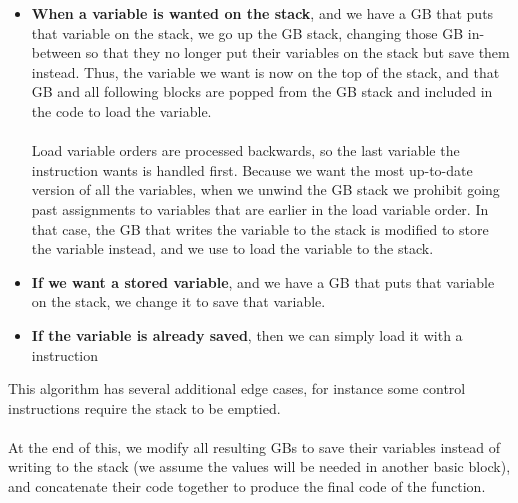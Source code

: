 \begin{itemize}
\item \textbf{When a variable is wanted on the stack}, and we have a GB that puts that variable on the stack, we go up the GB stack, changing those GB in-between so that they no longer put their variables on the stack but save them instead. Thus, the variable we want is now on the top of the stack, and that GB and all following blocks are popped from the GB stack and included in the code to load the variable.
\\\\
Load variable orders are processed backwards, so the last variable the instruction wants is handled first. Because we want the most up-to-date version of all the variables, when we unwind the GB stack we prohibit going past assignments to variables that are earlier in the load variable order. In that case, the GB that writes the variable to the stack is modified to store the variable instead, and we use  to load the variable to the stack.
\item \textbf{If we want a stored variable}, and we have a GB that puts that variable on the stack, we change it to save that variable.
\item \textbf{If the variable is already saved}, then we can simply load it with a  instruction
\end{itemize}
This algorithm has several additional edge cases, for instance some control instructions require the stack to be emptied.
\\\\
At the end of this, we modify all resulting GBs to save their variables instead of writing to the stack (we assume the values will be needed in another basic block), and concatenate their code together to produce the final code of the function.



